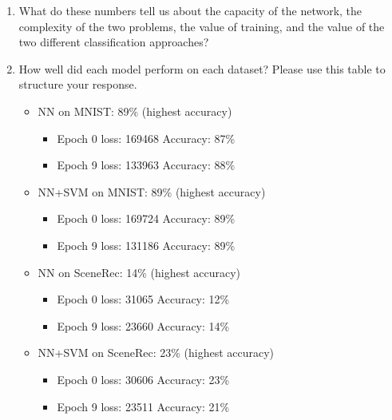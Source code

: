 \begin{enumerate}
	\item What do these numbers tell us about the capacity of the network, the complexity of the two problems, the value of training, and the value of the two different classification approaches?

	\item How well did each model perform on each dataset? Please use this table to structure your response.

	      \begin{itemize}
		      \item NN on MNIST: 89\% (highest accuracy)
		            \begin{itemize}
			            \item Epoch 0 loss: 169468     Accuracy: 87\%
			            \item Epoch 9 loss: 133963     Accuracy: 88\%
		            \end{itemize}
		      \item NN+SVM on MNIST: 89\% (highest accuracy)
		            \begin{itemize}
			            \item Epoch 0 loss: 169724     Accuracy: 89\%
			            \item Epoch 9 loss: 131186     Accuracy: 89\%
		            \end{itemize}
		      \item NN on SceneRec: 14\% (highest accuracy)
		            \begin{itemize}
			            \item Epoch 0 loss: 31065     Accuracy: 12\%
			            \item Epoch 9 loss: 23660     Accuracy: 14\%
		            \end{itemize}
		      \item NN+SVM on SceneRec: 23\% (highest accuracy)
		            \begin{itemize}
			            \item Epoch 0 loss: 30606     Accuracy: 23\%
			            \item Epoch 9 loss: 23511     Accuracy: 21\%
		            \end{itemize}
	      \end{itemize}

\end{enumerate}


